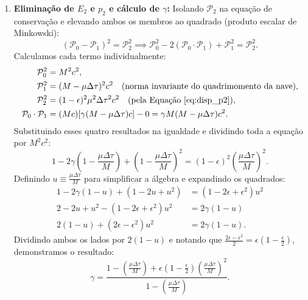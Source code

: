 \documentclass[11pt, a4paper]{article}
\begin{document}
\begin{enumerate}[label=\alph*)]
    \item \textbf{Eliminação de $E_2$ e $p_2$ e cálculo de $\gamma$:} Isolando $\mathcal{P}_2$ na equação de conservação e elevando ambos os membros ao quadrado (produto escalar de Minkowski):
    \begin{equation}
    (\mathcal{P}_0 - \mathcal{P}_1)^2 = \mathcal{P}_2^2 \implies \mathcal{P}_0^2 - 2 (\mathcal{P}_0 \cdot \mathcal{P}_1) + \mathcal{P}_1^2 = \mathcal{P}_2^2.
    \end{equation}
    Calculamos cada termo individualmente:
    \begin{align}
    \mathcal{P}_0^2 &= M^2 c^2, \nonumber \\
    \mathcal{P}_1^2 &= (M - \mu \Delta \tau)^2 c^2 \quad \text{(norma invariante do quadrimomento da nave)}, \nonumber \\
    \mathcal{P}_2^2 &= (1 - \epsilon)^2 \mu^2 \Delta \tau^2 c^2 \quad \text{(pela Equação \ref{eq:disp_p2})}, \nonumber \\
    \mathcal{P}_0 \cdot \mathcal{P}_1 &= (Mc) [\gamma (M - \mu \Delta \tau) c] - 0 = \gamma M (M - \mu \Delta \tau) c^2.
    \end{align}
    Substituindo esses quatro resultados na igualdade e dividindo toda a equação por $M^2 c^2$:
    \begin{equation}
    1 - 2 \gamma \left( 1 - \frac{\mu \Delta \tau}{M} \right) + \left( 1 - \frac{\mu \Delta \tau}{M} \right)^2 = (1 - \epsilon)^2 \left( \frac{\mu \Delta \tau}{M} \right)^2.
    \end{equation}
    Definindo $u \equiv \frac{\mu \Delta \tau}{M}$ para simplificar a álgebra e expandindo os quadrados:
    \begin{align}
    1 - 2 \gamma (1 - u) + (1 - 2u + u^2) &= (1 - 2\epsilon + \epsilon^2) u^2 \nonumber \\
    2 - 2u + u^2 - (1 - 2\epsilon + \epsilon^2) u^2 &= 2 \gamma (1 - u) \nonumber \\
    2 (1 - u) + (2\epsilon - \epsilon^2) u^2 &= 2 \gamma (1 - u).
    \end{align}
    Dividindo ambos os lados por $2(1 - u)$ e notando que $\frac{2\epsilon - \epsilon^2}{2} = \epsilon \left(1 - \frac{\epsilon}{2}\right)$, demonstramos o resultado:
    \begin{equation}
    \gamma = \frac{1 - \left(\frac{\mu \Delta \tau}{M}\right) + \epsilon \left(1 - \frac{\epsilon}{2}\right) \left(\frac{\mu \Delta \tau}{M}\right)^2}{1 - \left(\frac{\mu \Delta \tau}{M}\right)}.
    \end{equation}


\end{enumerate}
\end{document}
